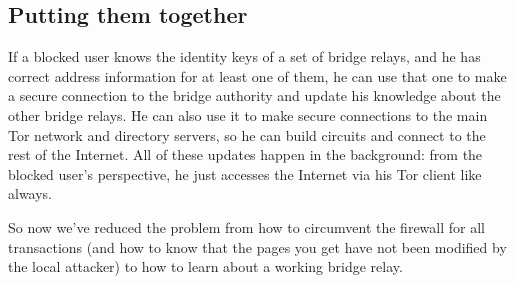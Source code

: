 \documentclass{llncs}
\begin{document}
%
%
%
%
%

\subsection{Putting them together}
\label{subsec:relay-together}

If a blocked user knows the identity keys of a set of bridge relays, and
he has correct address information for at least one of them, he can use
that one to make a secure connection to the bridge authority and update
his knowledge about the other bridge relays. He can also use it to make
secure connections to the main Tor network and directory servers, so he
can build circuits and connect to the rest of the Internet. All of these
updates happen in the background: from the blocked user's perspective,
he just accesses the Internet via his Tor client like always.

So now we've reduced the problem from how to circumvent the firewall
for all transactions (and how to know that the pages you get have not
been modified by the local attacker) to how to learn about a working
bridge relay.
\end{document}
